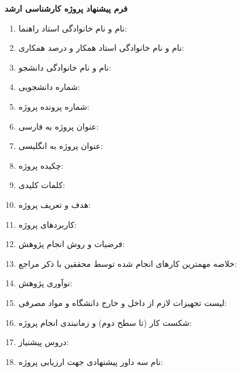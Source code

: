 
\thispagestyle{firstpage}
\pagestyle{empty}
\vspace*{.3em}
\begin{center}
	\hspace{-1cm}
	\textbf{فرم پیشنهاد پروژه کارشناسی ارشد}\\
	\hspace{-1cm}
	\textbf{\small\ThesisDepartment}
\end{center}
\begin{enumerate}[parsep = 0pt, listparindent = 0pt, itemsep=5pt]
	\SepMark{-}
\item
نام و نام خانوادگی استاد راهنما: \ThesisSupervisor
\item
نام و نام خانوادگی استاد همکار و درصد همکاری: \ThesisAdvisor
\item
نام و نام خانوادگی دانشجو: \ThesisAuthor
\item
شماره دانشجویی: \ThesisAuthorID
\item
شماره پرونده پروژه: \ThesisID
\item
عنوان پروژه به فارسی:\\
\ThesisTitleFa
\item
عنوان پروژه به انگلیسی:
\ThesisTitleEn
\item
چکیده پروژه:\\

\item
کلمات کلیدی:\\
\ThesisKeyWords
\item
هدف و تعریف پروژه:\\

\item
کاربردهای پروژه:\\

\item
فرضیات و روش انجام پژوهش:\\

\item
خلاصه مهمترین کارهای انجام شده توسط محققین با ذکر مراجع:\\

\item
نوآوری پژوهش:\\

\item
لیست تجهیزات لازم از داخل و خارج دانشگاه و مواد مصرفی:\\

\item
شکست کار (تا سطح دوم) و زمانبندی انجام پروژه:\\

\item
دروس پیشنیاز:\\

\item
نام سه داور پیشنهادی جهت ارزیابی پروژه:\\
\ThesisReferees
\end{enumerate}
\hspace{2.7cm}{امضای استاد راهنما:}\hspace{5cm}{امضای استاد همکار:}
